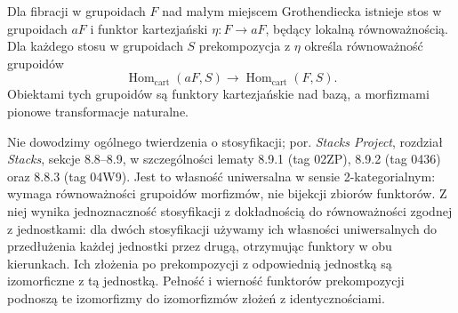 \begin{twierdzenie}\label{cat:thm:stackification}
Dla fibracji w grupoidach $F$ nad małym miejscem Grothendiecka istnieje stos w grupoidach $aF$ i funktor kartezjański $\eta:F\to aF$, będący lokalną równoważnością. Dla każdego stosu w grupoidach $S$ prekompozycja z $\eta$ określa równoważność grupoidów
\[
 \operatorname{Hom}_{\mathrm{cart}}(aF,S)
 \longrightarrow \operatorname{Hom}_{\mathrm{cart}}(F,S).
\]
Obiektami tych grupoidów są funktory kartezjańskie nad bazą, a morfizmami pionowe transformacje naturalne.
\end{twierdzenie}
Nie dowodzimy ogólnego twierdzenia o stosyfikacji; por. \emph{Stacks Project}, rozdział \emph{Stacks}, sekcje 8.8--8.9, w szczególności lematy 8.9.1 (tag 02ZP), 8.9.2 (tag 0436) oraz 8.8.3 (tag 04W9). Jest to własność uniwersalna w sensie 2-kategorialnym: wymaga równoważności grupoidów morfizmów, nie bijekcji zbiorów funktorów. Z niej wynika jednoznaczność stosyfikacji z dokładnością do równoważności zgodnej z jednostkami: dla dwóch stosyfikacji używamy ich własności uniwersalnych do przedłużenia każdej jednostki przez drugą, otrzymując funktory w obu kierunkach. Ich złożenia po prekompozycji z odpowiednią jednostką są izomorficzne z tą jednostką. Pełność i wierność funktorów prekompozycji podnoszą te izomorfizmy do izomorfizmów złożeń z identycznościami.

